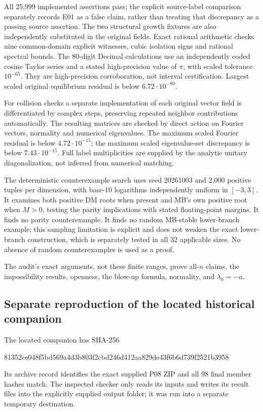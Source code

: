 \documentclass[11pt]{article}
\newcommand{\sha}[2]{\par{\small\ttfamily #1\allowbreak #2}\par}
\begin{document}
All 25,999 implemented assertions pass; the explicit source-label
comparison separately records E01 as a false claim, rather than
treating that discrepancy as a passing source assertion. The two
structural growth fixtures are also independently substituted in the
original fields. Exact rational arithmetic checks nine common-domain
explicit witnesses, cubic isolation signs and rational spectral bounds.
The 80-digit Decimal calculations use an independently coded cosine
Taylor series and a stated high-precision value of $\pi$, with scaled
tolerance $10^{-65}$. They are high-precision corroboration, not interval
certification. Largest scaled original equilibrium residual is below
$6.72\cdot10^{-80}$.

For collision checks a separate implementation of each original vector
field is differentiated by complex steps, preserving repeated neighbor
contributions automatically. The resulting matrices are checked by
direct action on Fourier vectors, normality and numerical eigenvalues.
The maximum scaled Fourier residual is below $4.72\cdot10^{-15}$;
the maximum scaled eigenvalue-set discrepancy is below
$7.43\cdot10^{-15}$. Full label multiplicities are supplied by the
analytic unitary diagonalization, not inferred from numerical matching.

The deterministic counterexample search uses seed 20261003 and 2,000
positive tuples per dimension, with base-10 logarithms independently
uniform in $[-3,3]$. It examines both positive DM roots when present
and MB's own positive root when $M>0$, testing the parity implications
with stated floating-point margins. It finds no parity counterexample.
It finds no random MB-stable lower-branch example; this sampling
limitation is explicit and does not weaken the exact lower-branch
construction, which is separately tested in all 32 applicable sizes.
No absence of random counterexamples is used as a proof.

The audit's exact arguments, not these finite ranges, prove all-$n$
claims, the impossibility results, openness, the blow-up formula,
normality, and $\lambda_0=-a$.

\subsection{Separate reproduction of the located historical companion}
The located companion has SHA-256
\sha{81352ce048f5bd569a4d3b803f2cbd246}{d412aa829de43f6b6d739f2521b3958}
Its archive record identifies the exact supplied P08 ZIP and all 98
final member hashes match. The inspected checker only reads its inputs
and writes its result files into the explicitly supplied output folder;
it was run into a separate temporary destination.
\end{document}
